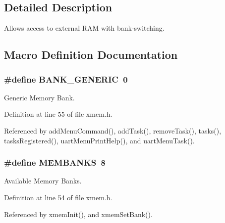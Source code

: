 \subsection{Detailed Description}
Allows access to external R\-A\-M with bank-\/switching. 

\subsection{Macro Definition Documentation}
\hypertarget{group__xmem_ga6b1167d0078b33af8ec17ededaebe0cb}{
\subsubsection[{B\-A\-N\-K\-\_\-\-G\-E\-N\-E\-R\-I\-C}]{\setlength{\rightskip}{0pt plus 5cm}\#define B\-A\-N\-K\-\_\-\-G\-E\-N\-E\-R\-I\-C~0}}\label{group__xmem_ga6b1167d0078b33af8ec17ededaebe0cb}


Generic Memory Bank. 



Definition at line 55 of file xmem.\-h.



Referenced by add\-Menu\-Command(), add\-Task(), remove\-Task(), tasks(), tasks\-Registered(), uart\-Menu\-Print\-Help(), and uart\-Menu\-Task().

\hypertarget{group__xmem_ga1ed280cb3dd0a4a03aeda6aaccc180d3}{
\subsubsection[{M\-E\-M\-B\-A\-N\-K\-S}]{\setlength{\rightskip}{0pt plus 5cm}\#define M\-E\-M\-B\-A\-N\-K\-S~8}}\label{group__xmem_ga1ed280cb3dd0a4a03aeda6aaccc180d3}


Available Memory Banks. 



Definition at line 54 of file xmem.\-h.



Referenced by xmem\-Init(), and xmem\-Set\-Bank().

